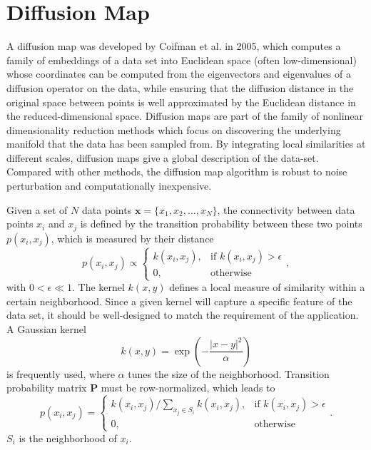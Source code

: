 \section{Diffusion Map\label{Sec:DR:DM}}
A diffusion map was developed by Coifman et al. in 2005\cite{CoifmanPNAS2005a,CoifmanPNAS2005b,CoifmanACHA2006}, which computes a family of embeddings of a data set into Euclidean space (often low-dimensional) whose coordinates can be computed from the eigenvectors and eigenvalues of a diffusion operator on the data, while ensuring that the diffusion distance in the original space between points is well approximated by the Euclidean distance in the reduced-dimensional space. Diffusion maps are part of the family of nonlinear dimensionality reduction methods which focus on discovering the underlying manifold that the data has been sampled from. By integrating local similarities at different scales, diffusion maps give a global description of the data-set. Compared with other methods, the diffusion map algorithm is robust to noise perturbation and computationally inexpensive.

Given a set of $N$ data points $\mathbf{x}=\{x_1, x_2,\dots,x_N\}$, the connectivity between data points $x_i$ and $x_j$ is defined by the transition probability between these two points $p(x_i,x_j)$, which is measured by their distance
\begin{equation}
	p(x_i,x_j)\propto \begin{cases}
		k(x_i,x_j), & \text{if } k(x_i,x_j) >\epsilon\\
		0, & \text{otherwise}
	\end{cases},
\end{equation}
with $0<\epsilon \ll 1$. The kernel $k(x,y)$ defines a local measure of similarity within a certain neighborhood. Since a given kernel will capture a specific feature of the data set, it should be well-designed to match the requirement of the application. A Gaussian kernel
\begin{equation}
	k(x,y)=\exp{\left(-\frac{|x-y|^2}{\alpha}\right)}
\end{equation}
is frequently used, where $\alpha$ tunes the size of the neighborhood. Transition probability matrix $\mathbf{P}$ must be row-normalized, which leads to
\begin{equation}
	p(x_i,x_j)= \begin{cases}
		k(x_i,x_j)/\sum\limits_{x_j\in S_i}k(x_i,x_j), & \text{if } k(x_i,x_j) >\epsilon\\
		0, & \text{otherwise}
	\end{cases}.
\end{equation}
$S_i$ is the neighborhood of $x_i$.
 
